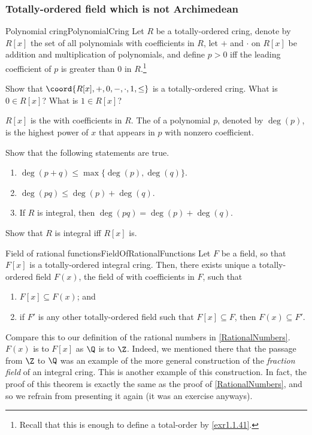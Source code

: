 \subsubsection{Totally-ordered field which is not Archimedean}

\begin{dfn}{Polynomial cring}{PolynomialCring}
Let $R$ be a totally-ordered cring, denote by $R[x]$ the set of all polynomials with coefficients in $R$, let $+$ and $\cdot$ on $R[x]$ be addition and multiplication of polynomials, and define $p>0$ iff the leading coefficient of $p$ is greater than $0$ in $R$.\footnote{Recall that this is enough to define a total-order by \cref{exr1.1.41}.} 
\begin{exr}[breakable=false]{}{}
Show that $\coord{R[x],+,0,-,\cdot ,1,\leq}$ is a totally-ordered cring.  What is $0\in R[x]$?  What is $1\in R[x]$?
\end{exr}
\noindent
$R[x]$ is the  with coefficients in $R$.  The  of a polynomial $p$, denoted by $\deg (p)$, is the highest power of $x$ that appears in $p$ with nonzero coefficient.
\end{dfn}
\begin{exr}{}{}
Show that the following statements are true.
\begin{enumerate}
\item $\deg (p+q)\leq \max \{ \deg (p),\deg (q)\}$.
\item $\deg (pq)\leq \deg (p)+\deg (q)$.
\item If $R$ is integral, then $\deg (pq)=\deg (p)+\deg (q)$.
\end{enumerate}
\end{exr}
\begin{exr}{}{}
Show that $R$ is integral iff $R[x]$ is.
\end{exr}
\begin{thm}{Field of rational functions}{FieldOfRationalFunctions}
Let $F$ be a field, so that $F[x]$ is a totally-ordered integral cring.  Then, there exists unique a totally-ordered field $F(x)$, the field of  with coefficients in $F$, such that
\begin{enumerate}
\item $F[x]\subseteq F(x)$; and
\item if $F'$ is any other totally-ordered field such that $F[x]\subseteq F
$, then $F(x)\subseteq F'$.
\end{enumerate}
\begin{rmk}
Compare this to our definition of the rational numbers in \cref{RationalNumbers}.  $F(x)$ is to $F[x]$ as $\Q$ is to $\Z$.  Indeed, we mentioned there that the passage from $\Z$ to $\Q$ was an example of the more general construction of the \emph{fraction field} of an integral cring.  This is another example of this construction.  In fact, the proof of this theorem is exactly the same as the proof of \cref{RationalNumbers}, and so we refrain from presenting it again (it was an exercise anyways).
\end{rmk}
\end{thm}
